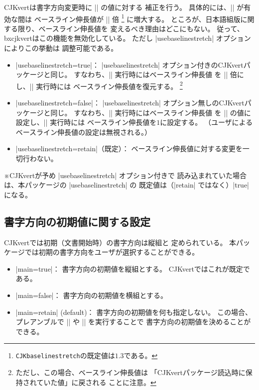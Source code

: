 \documentclass[a4paper]{ltjsarticle}
\newcommand{\Pkg}[1]{\textsf{#1}}
\newcommand{\Note}{\par\noindent ※}
\newcommand{\Means}{：\quad}
\newcommand{\Cs}[1]{\texttt{\symbol{`\\}#1}}
\begin{document}
\Pkg{CJKvert}は書字方向変更時に |\baselinestretch| の値に対する
補正を行う。
具体的には、|\CJKvert| が有効な間は
ベースライン伸長値が |\CJKbaselinestretch| 倍
\footnote{\Cs{CJKbaselinestretch}の既定値は$1.3$である。}
に増大する。
ところが、日本語組版に関する限り、ベースライン伸長値を
変えるべき理由はどこにもない。
従って、\Pkg{bxcjkvert}はこの機能を無効化している。
ただし |usebaselinestretch| オプションによりこの挙動は
調整可能である。


\begin{itemize}
\item |usebaselinestretch=true|\Means
  |usebaselinestretch| オプション付きの\Pkg{CJKvert}パッケージと同じ。
  すなわち、|\CJKvert| 実行時にはベースライン伸長値
  を |\CJKbaselinestretch| 倍にし、|\CJKhorz| 実行時には
  ベースライン伸長値を復元する。%
  \footnote{ただし、この場合、ベースライン伸長値は
  「\Pkg{CJKvert}パッケージ読込時に保持されていた値」に戻される
  ことに注意。}
\item |usebaselinestretch=false|\Means
  |usebaselinestretch| オプション無しの\Pkg{CJKvert}パッケージと同じ。
  すなわち、|\CJKvert| 実行時にはベースライン伸長値
  を |\CJKbaselinestretch| の値に設定し、|\CJKhorz| 実行時には
  ベースライン伸長値を$1$に設定する。
  （ユーザによるベースライン伸長値の設定は無視される。）
\item |usebaselinestretch=retain|（既定）\Means
  ベースライン伸長値に対する変更を一切行わない。
\end{itemize}

\Note \Pkg{CJKvert}が予め |usebaselinestretch| オプション付きで
読み込まれていた場合は、本パッケージの |usebaselinestretch| の
既定値は（|retain| ではなく）|true| になる。

\subsection{書字方向の初期値に関する設定}

\Pkg{CJKvert}では初期（文書開始時）の書字方向は縦組と
定められている。
本パッケージでは初期の書字方向をユーザが選択することができる。

\begin{itemize}
\item |main=true|\Means
  書字方向の初期値を縦組とする。
  \Pkg{CJKvert}ではこれが既定である。
\item |main=false|\Means
  書字方向の初期値を横組とする。
\item |main=retain| (default)\Means
  書字方向の初期値を何も指定しない。
  この場合、プレアンブルで |\CJKvert| や |\CJKhorz| を実行することで
  書字方向の初期値を決めることができる。
\end{itemize}

\end{document}
